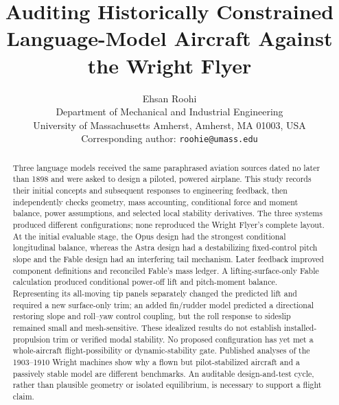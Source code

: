 \documentclass[10pt,letterpaper]{article}
\title{Auditing Historically Constrained Language-Model Aircraft Against the Wright Flyer}
\author{Ehsan Roohi\\
\small Department of Mechanical and Industrial Engineering\\
\small University of Massachusetts Amherst, Amherst, MA 01003, USA\\
\small Corresponding author: \texttt{roohie@umass.edu}}
\date{}
\begin{document}
\maketitle

\begin{abstract}
Three language models received the same paraphrased aviation sources dated no later than 1898 and were asked to design a piloted, powered airplane. This study records their initial concepts and subsequent responses to engineering feedback, then independently checks geometry, mass accounting, conditional force and moment balance, power assumptions, and selected local stability derivatives. The three systems produced different configurations; none reproduced the Wright Flyer's complete layout. At the initial evaluable stage, the Opus design had the strongest conditional longitudinal balance, whereas the Astra design had a destabilizing fixed-control pitch slope and the Fable design had an interfering tail mechanism. Later feedback improved component definitions and reconciled Fable's mass ledger. A lifting-surface-only Fable calculation produced conditional power-off lift and pitch-moment balance. Representing its all-moving tip panels separately changed the predicted lift and required a new surface-only trim; an added fin/rudder model predicted a directional restoring slope and roll--yaw control coupling, but the roll response to sideslip remained small and mesh-sensitive. These idealized results do not establish installed-propulsion trim or verified modal stability. No proposed configuration has yet met a whole-aircraft flight-possibility or dynamic-stability gate. Published analyses of the 1903--1910 Wright machines show why a flown but pilot-stabilized aircraft and a passively stable model are different benchmarks. An auditable design-and-test cycle, rather than plausible geometry or isolated equilibrium, is necessary to support a flight claim.
\end{abstract}
\end{document}
